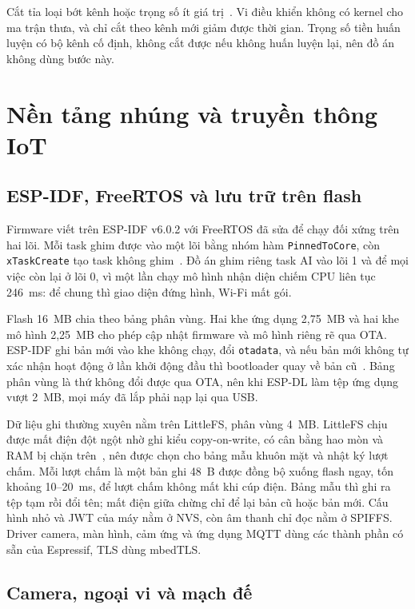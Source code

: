 \documentclass[../DoAn.tex]{subfiles}
\begin{document}
Cắt tỉa loại bớt kênh hoặc trọng số ít giá trị~\cite{liu2017}. Vi điều khiển không có kernel cho ma trận thưa, và chỉ cắt theo kênh mới giảm được thời gian. Trọng số tiền huấn luyện có bộ kênh cố định, không cắt được nếu
không huấn luyện lại, nên đồ án không dùng bước này.

\section{Nền tảng nhúng và truyền thông IoT}
\label{section:2.5}

\subsection{ESP-IDF, FreeRTOS và lưu trữ trên flash}
\label{section:2.5.1}

Firmware viết trên ESP-IDF v6.0.2 với FreeRTOS đã sửa để chạy đối xứng trên hai
lõi. Mỗi task ghim được vào một lõi bằng nhóm hàm \texttt{PinnedToCore}, còn
\texttt{xTaskCreate} tạo task không ghim~\cite{espidffreertos}. Đồ án ghim riêng
task AI vào lõi 1 và để mọi việc còn lại ở lõi 0, vì một lần chạy mô hình nhận
diện chiếm CPU liên tục 246~ms: để chung thì giao diện đứng hình, Wi-Fi mất gói.

Flash 16~MB chia theo bảng phân vùng. Hai khe ứng dụng 2,75~MB và hai khe mô hình
2,25~MB cho phép cập nhật firmware và mô hình riêng rẽ qua OTA. ESP-IDF ghi bản
mới vào khe không chạy, đổi \texttt{otadata}, và nếu bản mới không tự xác nhận
hoạt động ở lần khởi động đầu thì bootloader quay về bản cũ~\cite{espidfota}. Bảng
phân vùng là thứ không đổi được qua OTA, nên khi ESP-DL làm tệp ứng dụng
vượt 2~MB, mọi máy đã lắp phải nạp lại qua USB.

Dữ liệu ghi thường xuyên nằm trên LittleFS, phân vùng 4~MB. LittleFS chịu được mất
điện đột ngột nhờ ghi kiểu copy-on-write, có cân bằng hao mòn và RAM bị chặn
trên~\cite{littlefs}, nên được chọn cho bảng mẫu khuôn mặt và nhật ký lượt chấm.
Mỗi lượt chấm là một bản ghi 48~B được đồng bộ xuống flash ngay, tốn khoảng
10--20~ms, để lượt chấm không mất khi cúp điện. Bảng mẫu thì ghi ra tệp tạm rồi đổi tên; mất điện giữa chừng chỉ để lại bản cũ hoặc bản mới. Cấu hình nhỏ
và JWT của máy nằm ở NVS, còn âm thanh chỉ đọc nằm ở SPIFFS. Driver camera, màn
hình, cảm ứng và ứng dụng MQTT dùng các thành phần có sẵn của Espressif, TLS dùng
mbedTLS.

\subsection{Camera, ngoại vi và mạch đế}
\label{section:2.5.2}
\end{document}
